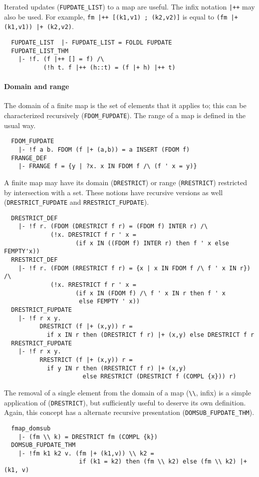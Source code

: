 Iterated updates ({\small\verb+FUPDATE_LIST+}) to a map are
useful. The infix notation \verb#|++# may also be used.
For example, {\small\verb#fm |++ [(k1,v1) ; (k2,v2)]#} is equal
to {\small\verb#(fm |+ (k1,v1)) |+ (k2,v2)#}.
%
{\small
\begin{verbatim}
  FUPDATE_LIST  |- FUPDATE_LIST = FOLDL FUPDATE
  FUPDATE_LIST_THM
    |- !f. (f |++ [] = f) /\
           (!h t. f |++ (h::t) = (f |+ h) |++ t)
\end{verbatim}}


\paragraph {Domain and range}

The domain of a finite map is the set of elements that it applies to;
this can be characterized recursively
({\small\verb+FDOM_FUPDATE+}). The range of a map is defined in the
usual way.
{\small
\begin{verbatim}
  FDOM_FUPDATE
    |- !f a b. FDOM (f |+ (a,b)) = a INSERT (FDOM f)
  FRANGE_DEF
    |- FRANGE f = {y | ?x. x IN FDOM f /\ (f ' x = y)}
\end{verbatim}}
%
A finite map may have its domain ({\small\verb+DRESTRICT+})
or range ({\small\verb+RRESTRICT+}) restricted by intersection with a
set. These notions have recursive versions as well
({\small\verb+DRESTRICT_FUPDATE+} and {\small\verb+RRESTRICT_FUPDATE+}).
%
{\small
\begin{verbatim}
  DRESTRICT_DEF
    |- !f r. (FDOM (DRESTRICT f r) = (FDOM f) INTER r) /\
             (!x. DRESTRICT f r ' x =
                    (if x IN ((FDOM f) INTER r) then f ' x else FEMPTY'x))
  RRESTRICT_DEF
    |- !f r. (FDOM (RRESTRICT f r) = {x | x IN FDOM f /\ f ' x IN r}) /\
             (!x. RRESTRICT f r ' x =
                    (if x IN (FDOM f) /\ f ' x IN r then f ' x
                     else FEMPTY ' x))
  DRESTRICT_FUPDATE
    |- !f r x y.
          DRESTRICT (f |+ (x,y)) r =
            if x IN r then (DRESTRICT f r) |+ (x,y) else DRESTRICT f r
  RRESTRICT_FUPDATE
    |- !f r x y.
          RRESTRICT (f |+ (x,y)) r =
            if y IN r then (RRESTRICT f r) |+ (x,y)
                      else RRESTRICT (DRESTRICT f (COMPL {x})) r)
\end{verbatim}}
\noindent The removal of a single element from the domain of a map
(\verb+\\+, infix) is a simple application of
({\small\verb+DRESTRICT+}), but sufficiently useful to deserve its own
definition. Again, this concept has a alternate recursive presentation
({\small\verb+DOMSUB_FUPDATE_THM+}).
%
{\small
\begin{verbatim}
  fmap_domsub
    |- (fm \\ k) = DRESTRICT fm (COMPL {k})
  DOMSUB_FUPDATE_THM
    |- !fm k1 k2 v. (fm |+ (k1,v)) \\ k2 =
                     if (k1 = k2) then (fm \\ k2) else (fm \\ k2) |+ (k1, v)
\end{verbatim}}

